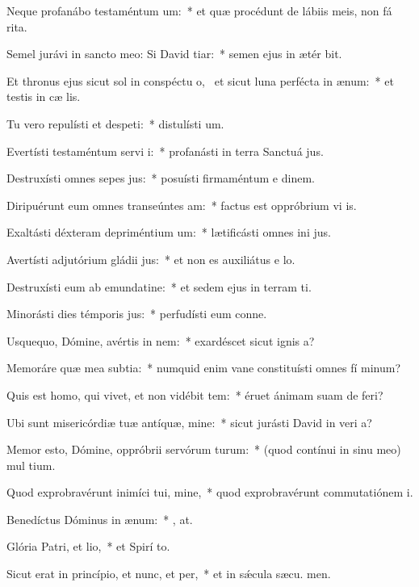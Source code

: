 \item Neque profanábo testaméntum um:~* et quæ procédunt de lábiis meis, non fá rita.
\item Semel jurávi in sancto meo: Si David tiar:~* semen ejus in ætér bit.
\item Et thronus ejus sicut sol in conspéctu o,~\pscross{} et sicut luna perfécta in ænum:~* et testis in cæ lis.
\item Tu vero repulísti et despeti:~* distulísti  um.
\item Evertísti testaméntum servi i:~* profanásti in terra Sanctuá jus.
\item Destruxísti omnes sepes jus:~* posuísti firmaméntum e dinem.
\item Diripuérunt eum omnes transeúntes am:~* factus est oppróbrium vi is.
\item Exaltásti déxteram depriméntium um:~* lætificásti omnes ini jus.
\item Avertísti adjutórium gládii jus:~* et non es auxiliátus e  lo.
\item Destruxísti eum ab emundatine:~* et sedem ejus in terram ti.
\item Minorásti dies témporis jus:~* perfudísti eum conne.
\item Usquequo, Dómine, avértis in nem:~* exardéscet sicut ignis  a?
\item Memoráre quæ mea subtia:~* numquid enim vane constituísti omnes fí minum?
\item Quis est homo, qui vivet, et non vidébit tem:~* éruet ánimam suam de  feri?
\item Ubi sunt misericórdiæ tuæ antíquæ, mine:~* sicut jurásti David in veri a?
\item Memor esto, Dómine, oppróbrii servórum turum:~* (quod contínui in sinu meo) mul tium.
\item Quod exprobravérunt inimíci tui, mine,~* quod exprobravérunt commutatiónem  i.
\item Benedíctus Dóminus in ænum:~* , at.
\item Glória Patri, et lio,~* et Spirí to.
\item Sicut erat in princípio, et nunc, et per,~* et in sǽcula sæcu. men.
